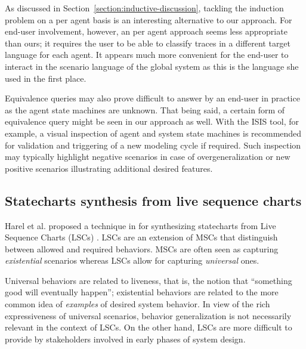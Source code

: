 As discussed in Section~\ref{section:inductive-discussion}, tackling the induction problem on a per agent basis is an interesting alternative to our approach. For end-user involvement, however, an per agent approach seems less appropriate than ours; it requires the user to be able to classify traces in a different target language for each agent. It appears much more convenient for the end-user to interact in the scenario language of the global system as this is the language she used in the first place.

Equivalence queries may also prove difficult to answer by an end-user in practice as the agent state machines are unknown. That being said, a certain form of equivalence query might be seen in our approach as well. With the ISIS tool, for example, a visual inspection of agent and system state machines is recommended for validation and triggering of a new modeling cycle if required. Such inspection may typically highlight negative scenarios in case of overgeneralization or new positive scenarios illustrating additional desired features. 


\subsection{Statecharts synthesis from live sequence charts}

Harel et al. proposed a technique in \cite{Harel:2005} for synthesizing statecharts from Live Sequence Charts (LSCs) \cite{Damm:2001}. LSCs are an extension of MSCs that distinguish between allowed and required behaviors. MSCs are often seen as capturing \emph{existential} scenarios whereas LSCs allow for capturing \emph{universal} ones. 

Universal behaviors are related to liveness, that is, the notion that ``something good will eventually happen''; existential behaviors are related to the more common idea of \emph{examples} of desired system behavior. In view of the rich expressiveness of universal scenarios, behavior generalization is not necessarily relevant in the context of LSCs. On the other hand, LSCs are more difficult to provide by stakeholders involved in early phases of system design. 

